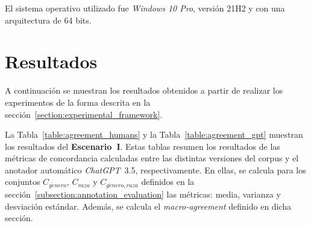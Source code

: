 El sistema operativo utilizado fue \emph{Windows 10 Pro}, versi\'on 21H2 y con una arquitectura de 64 bits.

\section{Resultados}\label{section:results}
A continuaci\'on se muestran los resultados obtenidos a partir de realizar los experimentos de la forma descrita en la 
secci\'on~\ref{section:experimental_framework}.

La Tabla~\ref{table:agreement_humans} y la Tabla~\ref{table:agreement_gpt} muestran los resultados del \textbf{Escenario~I}.
Estas tablas resumen los resultados de las m\'etricas de concordancia calculadas entre las distintas
versiones del corpus y el anotador autom\'atico \emph{ChatGPT}~3.5, respectivamente. En ellas, se 
calcula para los conjuntos $C_{g\acute{e}nero}$, $C_{raza}$ y $C_{g\acute{e}nero, raza}$ definidos
en la secci\'on~\ref{subsection:annotation_evaluation} las m\'etricas: media, varianza y desviaci\'on
est\'andar. Adem\'as, se calcula el \emph{macro-agreement} definido en dicha secci\'on.

